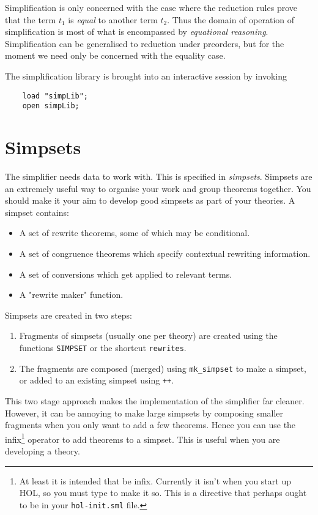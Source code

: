 Simplification is only concerned with the case where the reduction rules
prove that the term $t_1$ is {\it equal} to another term $t_2$.  Thus
the domain of operation of simplification is most of what is encompassed
by {\it equational reasoning}.  Simplification can be generalised to
reduction under preorders, but for the moment we need only be concerned
with the equality case.

The simplification library is brought into an interactive session by
invoking
\begin{verbatim}
    load "simpLib"; 
    open simpLib;
\end{verbatim}

\section{Simpsets}

The simplifier needs data to work with.  This is specified in
{\em simpsets}. Simpsets are an extremely useful way to organise
your work and group theorems together.  You should make it your
aim to develop good simpsets as part of your theories.
A simpset contains:
\begin{itemize}
    \item A set of rewrite theorems, some of which may be conditional.
    \item A set of congruence theorems which specify
          contextual rewriting information.
    \item A set of conversions which get applied to relevant terms.
    \item A "rewrite maker" function.
\end{itemize}
Simpsets are created in two steps:
\begin{enumerate}
   \item Fragments of simpsets (usually one per theory) are created
using the functions {\tt SIMPSET} or the shortcut {\tt rewrites}.
   \item The fragments are composed (merged) using {\tt mk\_simpset} to
make a simpset, or added to an existing simpset using {\tt ++}.
\end{enumerate}
This two stage approach makes the implementation of the simplifier far
cleaner.  However, it can be annoying to make large simpsets by
composing smaller fragments when you only want to add a few theorems.
Hence you can use the infix\footnote{At least it is intended that
\ml{++} be infix. Currently it isn't when you start up HOL, so you
must type  to make it so. This is a directive that perhaps
ought to be in your \verb+hol-init.sml+ file.} operator \ml{++} to add
theorems to a simpset.  This is useful when you are developing a
theory.

